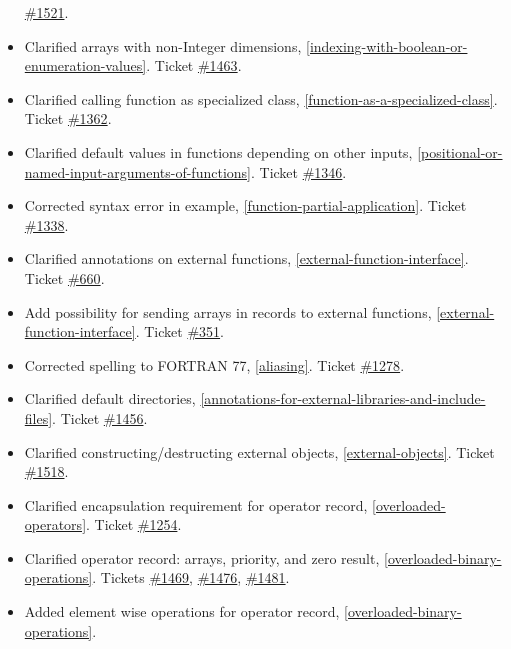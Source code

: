 \documentclass[../MLS.tex]{subfiles}
\begin{document}
\begin{itemize}
  \href{https://trac.modelica.org/Modelica/ticket/1521}{\#1521}.
\item
  Clarified arrays with non-Integer dimensions, \autoref{indexing-with-boolean-or-enumeration-values}. Ticket
  \href{https://trac.modelica.org/Modelica/ticket/1463}{\#1463}.
\item
  Clarified calling function as specialized class, \autoref{function-as-a-specialized-class}. Ticket
  \href{https://trac.modelica.org/Modelica/ticket/1362}{\#1362}.
\item
  Clarified default values in functions depending on other inputs,
  \autoref{positional-or-named-input-arguments-of-functions}. Ticket
  \href{https://trac.modelica.org/Modelica/ticket/1346}{\#1346}.
\item
  Corrected syntax error in example, \autoref{function-partial-application}. Ticket
  \href{https://trac.modelica.org/Modelica/ticket/1338}{\#1338}.
\item
  Clarified annotations on external functions, \autoref{external-function-interface}. Ticket
  \href{https://trac.modelica.org/Modelica/ticket/660}{\#660}.
\item
  Add possibility for sending arrays in records to external functions,
  \autoref{external-function-interface}. Ticket
  \href{https://trac.modelica.org/Modelica/ticket/351}{\#351}.
\item
  Corrected spelling to FORTRAN 77, \autoref{aliasing}. Ticket
  \href{https://trac.modelica.org/Modelica/ticket/1278}{\#1278}.
\item
  Clarified default directories, \autoref{annotations-for-external-libraries-and-include-files}. Ticket
  \href{https://trac.modelica.org/Modelica/ticket/1456}{\#1456}.
\item
  Clarified constructing/destructing external objects, \autoref{external-objects}.
  Ticket \href{https://trac.modelica.org/Modelica/ticket/1518}{\#1518}.
\item
  Clarified encapsulation requirement for operator record, \autoref{overloaded-operators}.
  Ticket \href{https://trac.modelica.org/Modelica/ticket/1254}{\#1254}.
\item
  Clarified operator record: arrays, priority, and zero result, 
  \autoref{overloaded-binary-operations}. Tickets
  \href{https://trac.modelica.org/Modelica/ticket/1469}{\#1469},
  \href{https://trac.modelica.org/Modelica/ticket/1476}{\#1476},
  \href{https://trac.modelica.org/Modelica/ticket/1481}{\#1481}.
\item
  Added element wise operations for operator record, \autoref{overloaded-binary-operations}.

\end{itemize}
\end{document}
